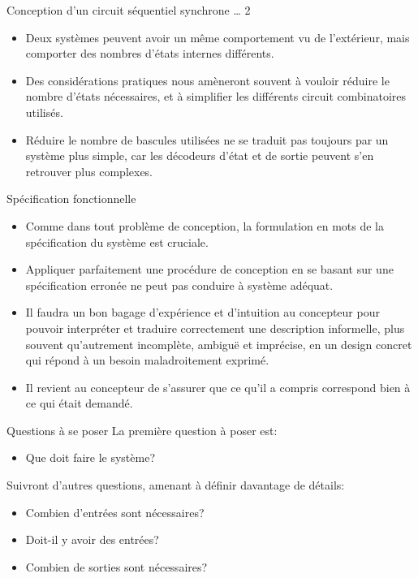 \documentclass[presentation]{beamer}
\begin{document}
\begin{frame}[label={sec:org7be5292}]{Conception d'un circuit séquentiel synchrone \ldots{} 2}
\begin{itemize}
\item Deux systèmes peuvent avoir un même comportement vu de l'extérieur, mais comporter des nombres d'états internes différents.

\item Des considérations pratiques nous amèneront souvent à vouloir réduire le nombre d'états nécessaires, et à simplifier les différents circuit combinatoires utilisés.

\item Réduire le nombre de bascules utilisées ne se traduit pas toujours par un système plus simple, car les décodeurs d'état et de sortie peuvent s'en retrouver plus complexes.
\end{itemize}
\end{frame}

\begin{frame}[label={sec:orgfe43f11}]{Spécification fonctionnelle}
\begin{itemize}
\item Comme dans tout problème de conception, la formulation en mots de la spécification du système est cruciale.

\item Appliquer parfaitement une procédure de conception en se basant sur une spécification erronée ne peut pas conduire à système adéquat.

\item Il faudra un bon bagage d'expérience et d'intuition au concepteur pour pouvoir interpréter et traduire correctement une description informelle, plus souvent qu'autrement incomplète, ambiguë et imprécise, en un design concret qui répond à un besoin maladroitement exprimé.

\item Il revient au concepteur de s'assurer que ce qu'il a compris correspond bien à ce qui était demandé.
\end{itemize}
\end{frame}

\begin{frame}[label={sec:orgdad53ec}]{Questions à se poser}
La première question à poser est: 

\begin{itemize}
\item Que doit faire le système?
\end{itemize}

Suivront d'autres questions, amenant à définir davantage de détails: 

\begin{itemize}
\item Combien d'entrées sont nécessaires?

\item Doit-il y avoir des entrées?

\item Combien de sorties sont nécessaires?
\end{itemize}
\end{frame}
\end{document}

